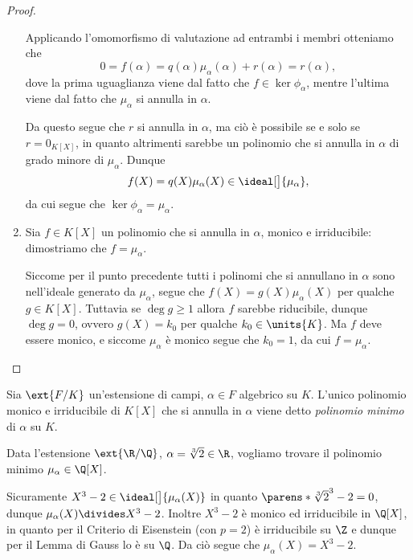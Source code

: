 \begin{proof}
\begin{enumerate}[label={(\roman*)}]
        Applicando l'omomorfismo di valutazione ad entrambi i membri otteniamo che \[
            0 = f(\alpha) = q(\alpha)\mu_\alpha(\alpha) + r(\alpha) = r(\alpha),
        \] dove la prima uguaglianza viene dal fatto che $f \in \ker \phi_\alpha$, mentre l'ultima viene dal fatto che $\mu_\alpha$ si annulla in $\alpha$.

        Da questo segue che $r$ si annulla in $\alpha$, ma ciò è possibile se e solo se $r = 0_{K[X]}$, in quanto altrimenti sarebbe un polinomio che si annulla in $\alpha$ di grado minore di $\mu_\alpha$. Dunque \[
            f(X) = q(X)\mu_\alpha(X) \in \ideal[\big]{\mu_\alpha}, 
        \] da cui segue che $\ker \phi_\alpha = \mu_\alpha$.
        \item Sia $f \in K[X]$ un polinomio che si annulla in $\alpha$, monico e irriducibile: dimostriamo che $f = \mu_\alpha$.
        
        Siccome per il punto precedente tutti i polinomi che si annullano in $\alpha$ sono nell'ideale generato da $\mu_\alpha$, segue che $f(X) = g(X)\mu_\alpha(X)$ per qualche $g \in K[X]$. Tuttavia se $\deg g \geq 1$ allora $f$ sarebbe riducibile, dunque $\deg g = 0$, ovvero $g(X) = k_0$ per qualche $k_0 \in \units{K}$. Ma $f$ deve essere monico, e siccome $\mu_\alpha$ è monico segue che $k_0 = 1$, da cui $f = \mu_\alpha$. \qedhere
    \end{enumerate}
\end{proof}

\begin{definition}
     Sia $\ext{F/K}$ un'estensione di campi, $\alpha \in F$ algebrico su $K$. L'unico polinomio monico e irriducibile di $K[X]$ che si annulla in $\alpha$ viene detto \emph{polinomio minimo} di $\alpha$ su $K$.
\end{definition}

\begin{example}
    Data l'estensione $\ext{\R / \Q}$, $\alpha = \sqrt[3]{2} \in \R$, vogliamo trovare il polinomio minimo $\mu_\alpha \in \Q[X]$.

    Sicuramente $X^3 - 2 \in \ideal[\big]{\mu_\alpha(X)}$ in quanto $\parens*{\sqrt[3]{2}}^3 - 2 = 0$, dunque $\mu_\alpha(X) \divides X^3 - 2$. Inoltre $X^3 - 2$ è monico ed irriducibile in $\Q[X]$, in quanto per il Criterio di Eisenstein (con $p = 2$) è irriducibile su $\Z$ e dunque per il Lemma di Gauss lo è su $\Q$. Da ciò segue che $\mu_\alpha(X) = X^3 - 2$.
\end{example}

